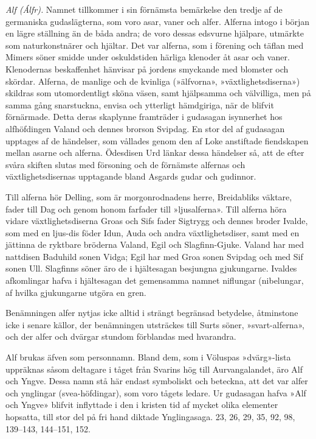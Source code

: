 \emph{Alf (Álfr).} Namnet tillkommer i sin förnämsta bemärkelse den
tredje af de germaniska gudaslägterna, som voro asar, vaner och alfer.
Alferna intogo i början en lägre ställning än de båda andra; de voro
dessas edsvurne hjälpare, utmärkte som naturkonstnärer och hjältar. Det
var alferna, som i förening och täflan med Mimers söner smidde under
oskuldstiden härliga klenoder åt asar och vaner. Klenodernas
beskaffenhet hänvisar på jordens smyckande med blomster och skördar.
Alferna, de manlige och de kvinliga (»älfvorna», »växtlighetsdiserna»)
skildras som utomordentligt sköna väsen, samt hjälpsamma och välvilliga,
men på samma gång snarstuckna, envisa och ytterligt hämdgiriga, när de
blifvit förnärmade. Detta deras skaplynne framträder i gudasagan
isynnerhet hos alfhöfdingen Valand och dennes brorson Svipdag. En stor
del af gudasagan upptages af de händelser, som vållades genom den af
Loke anstiftade fiendskapen mellan asarne och alferna. Ödesdisen Urd
länkar dessa händelser så, att de efter svåra skiften slutas med
försoning och de förnämste alfernas och växtlighetsdisernas upptagande
bland Asgards gudar och gudinnor.

Till alferna hör Delling, som är morgonrodnadens herre, Breidabliks
väktare, fader till Dag och genom honom farfader till »ljusalferna».
Till alferna höra vidare växtlighetsdiserna Groas och Sifs fader
Sigtrygg och dennes broder Ivalde, som med en ljus-dis föder Idun, Auda
och andra växtlighetsdiser, samt med en jättinna de ryktbare bröderna
Valand, Egil och Slagfinn-Gjuke. Valand har med nattdisen Baduhild sonen
Vidga; Egil har med Groa sonen Svipdag och med Sif sonen Ull. Slagfinns
söner äro de i hjältesagan besjungna gjukungarne. Ivaldes afkomlingar
hafva i hjältesagan det gemensamma namnet niflungar (nibelungar, af
hvilka gjukungarne utgöra en gren.

Benämningen alfer nytjas icke alltid i strängt begränsad betydelse,
åtminstone icke i senare källor, der benämningen utsträckes till Surts
söner, »svart-alferna», och der alfer och dvärgar stundom förblandas med
hvarandra.

Alf brukas äfven som personnamn. Bland dem, som i Völuspas »dvärg»-lista
uppräknas såsom deltagare i tåget från Svarins hög till Aurvangalandet,
äro Alf och Yngve. Dessa namn stå här endast symboliskt och beteckna,
att det var alfer och ynglingar (svea-höfdingar), som voro tågets
ledare. Ur gudasagan hafva »Alf och Yngve» blifvit inflyttade i den i
kristen tid af mycket olika elementer hopsatta, till stor del på fri
hand diktade Ynglingasaga. 23, 26, 29, 35, 92, 98, 139--143, 144--151,
152.

